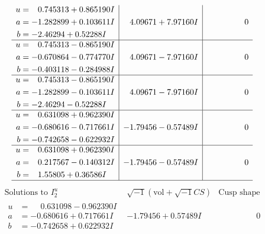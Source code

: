 \documentclass[1p]{elsarticle_modified}
\theoremstyle{definition}
\newcommand{\I}{\sqrt{-1}}
\begin{document}
$$\begin{array}{c|c|c}
\begin{aligned}
u &= \phantom{-}0.745313 + 0.865190 I \\
a &= -1.282899 + 0.103611 I \\
b &= -2.46294 + 0.52288 I\end{aligned}
 & \phantom{-}4.09671 + 7.97160 I & \phantom{-0.000000 } 0 \\ \hline\begin{aligned}
u &= \phantom{-}0.745313 - 0.865190 I \\
a &= -0.670864 - 0.774770 I \\
b &= -0.403118 - 0.284988 I\end{aligned}
 & \phantom{-}4.09671 - 7.97160 I & \phantom{-0.000000 } 0 \\ \hline\begin{aligned}
u &= \phantom{-}0.745313 - 0.865190 I \\
a &= -1.282899 - 0.103611 I \\
b &= -2.46294 - 0.52288 I\end{aligned}
 & \phantom{-}4.09671 - 7.97160 I & \phantom{-0.000000 } 0 \\ \hline\begin{aligned}
u &= \phantom{-}0.631098 + 0.962390 I \\
a &= -0.680616 - 0.717661 I \\
b &= -0.742658 - 0.622932 I\end{aligned}
 & -1.79456 - 0.57489 I & \phantom{-0.000000 } 0 \\ \hline\begin{aligned}
u &= \phantom{-}0.631098 + 0.962390 I \\
a &= \phantom{-}0.217567 - 0.140312 I \\
b &= \phantom{-}1.55805 + 0.36586 I\end{aligned}
 & -1.79456 - 0.57489 I & \phantom{-0.000000 } 0\\
 \hline 
 \end{array}$$\newpage$$\begin{array}{c|c|c}  
\text{Solutions to }I^u_{2}& \I (\text{vol} + \sqrt{-1}CS) & \text{Cusp shape}\\
 \hline 
\begin{aligned}
u &= \phantom{-}0.631098 - 0.962390 I \\
a &= -0.680616 + 0.717661 I \\
b &= -0.742658 + 0.622932 I\end{aligned}
 & -1.79456 + 0.57489 I & \phantom{-0.000000 } 0 \\ \hline\begin{aligned}

\end{aligned}
\end{array}$$
\end{document}
